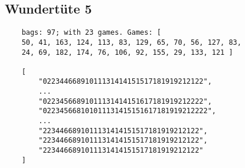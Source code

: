 \subsection{Wundertüte 5}
\begin{verbatim}
    bags: 97; with 23 games. Games: [
    50, 41, 163, 124, 113, 83, 129, 65, 70, 56, 127, 83,
    24, 69, 182, 174, 76, 106, 92, 155, 29, 133, 121 ]

    [
        "02234466891011131414151517181919212122", 
        ...
        "02234566891011131414151617181919212222", 
        "022345668101011131415151617181919212222", 
        ...
        "2234466891011131414151517181919212122", 
        "2234466891011131414151517181919212122", 
        "2234466891011131414151517181919212122"
    ]    
\end{verbatim}